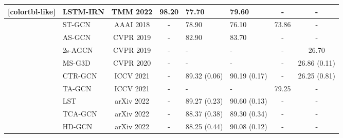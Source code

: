 \documentclass[letterpaper, 10 pt, conference]{ieeeconf}
\begin{document}
\begin{table*}[t]
{\begin{threeparttable}
{\begin{NiceTabular}{c|l|c|c|C{22mm}|C{22mm}|c|c}[colortbl-like]
            &
            LSTM-IRN\cite{LSTM-IRN2022}&
            TMM 2022&
            98.20&
            77.70&
            79.60&
            -&
            -\\

            \hline

            &
            ST-GCN\cite{ST-GCN2018}&
            AAAI 2018&
            -&
            78.90&
            76.10&
            73.86&
            -\\

            &
            AS-GCN\cite{AS-GCN2019}&
            CVPR 2019&
            -&
            82.90&
            83.70&
            -&
            -\\

            &
            2s-AGCN\cite{2s-AGCN2019}&
            CVPR 2019&
            -&
            -&
            -&
            -&
            26.70\\

            &
            MS-G3D\cite{MS-G3D2020}&
            CVPR 2020&
            -&
            -&
            -&
            -&
            26.86 (0.11)\\

            &
            CTR-GCN\cite{CTR-GCN2021}&
            ICCV 2021&
            -&
            89.32 (0.06)&
            90.19 (0.17)&
            -&
            26.25 (0.81) \\

            &
            TA-GCN\cite{H2O_TA-GCN2021}&
            ICCV 2021&
            -&
            -&
            -&
            79.25&
            -\\

            &
            LST\cite{LST2022}&
            arXiv 2022&
            -&
            89.27 (0.23)&
            90.60 (0.13)&
            -&
            -\\

            &
            TCA-GCN\cite{tcagcn2022}&
            arXiv 2022&
            -&
            88.37 (0.38)&
            89.30 (0.34)&
            -&
            -\\

            &
            HD-GCN\cite{hdgcn2022}&
            arXiv 2022&
            -&
            88.25 (0.44)&
            90.08 (0.12)&
            -&
            -\\


\end{NiceTabular}}
\end{threeparttable}}
\end{table*}
\end{document}
